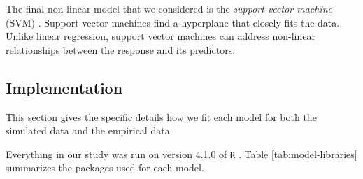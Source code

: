 \documentclass{article}
\begin{document}

	The final non-linear model that we considered is the \textit{support vector machine} (SVM) \cite{cortes1995support, drucker1997support}. Support vector machines find a hyperplane that closely fits the data. Unlike linear regression, support vector machines can address non-linear relationships between the response and its predictors.
	
	
	\subsection{Implementation}
	
	This section gives the specific details how we fit each model for both the simulated data and the empirical data.

	 Everything in our study was run on version 4.1.0 of \lstinline!R! \cite{r}. Table \ref{tab:model-libraries} summarizes the packages used for each model.
	 
\end{document}
